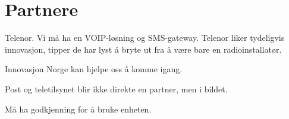 \section{Partnere}

Telenor. Vi må ha en VOIP-løsning og SMS-gateway.
Telenor liker tydeligvis innovasjon, tipper de har lyst å bryte ut fra å være
bare en radioinstallatør.

Innovasjon Norge kan hjelpe oss å komme igang.

Post og teletilsynet blir ikke direkte en partner, men i bildet.

Må ha godkjenning for å bruke enheten.
